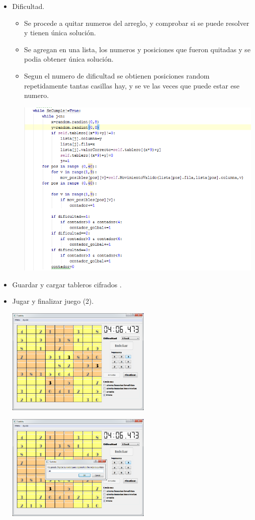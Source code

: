 \documentclass[12pt,oneside]{book}
\begin{document}
\begin{itemize}
\item  Dificultad.
\begin {itemize}
	\item Se procede a quitar numeros del arreglo, y comprobar si se puede resolver y tienen única solución.
	\item Se agregan en una lista, los numeros y posiciones que fueron quitadas y se podia obtener única solución.
	\item Segun el numero de dificultad se obtienen posiciones random repetidamente tantas casillas hay, y se ve las veces 
	que puede estar ese numero.


	\includegraphics[width=1.2\textwidth]{./imagenes/Codigo_dificultad.png}
\end {itemize}
\item  Guardar y cargar tableros cifrados .

	
\item   Jugar y finalizar juego (2).

 	\includegraphics[width=0.55\textwidth]{./imagenes/PantallaJugando.png}

	\includegraphics[width=0.55\textwidth]{./imagenes/Codigo_finalizar.png}


\end{itemize}
\end{document}
